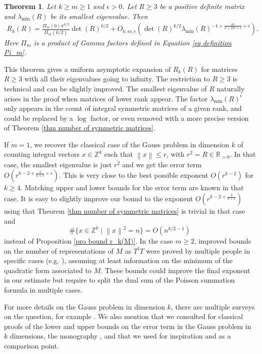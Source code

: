 \documentclass[oneside]{amsart}
\numberwithin{equation}{section}
\newtheorem{theorem}{Theorem}[section]
\theoremstyle{definition}
\theoremstyle{remark}
\theoremstyle{remark}
\newcommand{\RR}{\mathbb R}
\newcommand{\ZZ}{\mathbb Z}
\newcommand{\norm}[1]{\left\lVert #1\right\rVert}		%
\begin{document}
\begin{theorem}\label{thm R_k(R) asymptotic}
Let $k\geq m\geq1$ and $\epsilon>0$. Let $R\geq3$ be a positive definite matrix and $\lambda_{\min}(R)$ be its smallest eigenvalue. Then
\begin{align}\label{eq R_k(R) asymptotic}
R_k(R)=\frac{\Pi_m(0)\pi^{k/2}}{\Pi_m(k/2)}\det(R)^{k/2}+O_{k,m,\epsilon}\left(\det(R)^{k/2}\lambda_{\min}(R)^{-1+\frac m{k+2m+1}+\epsilon}\right).
\end{align}
Here $\Pi_m$ is a product of Gamma factors defined in Equation \eqref{eq definition Pi_m}.
\end{theorem}

This theorem gives a uniform asymptotic expansion of $R_k(R)$ for matrices $R\geq3$ with all their eigenvalues going to infinity. The restriction to $R\geq3$ is technical and can be slightly improved. The smallest eigenvalue of $R$ naturally arises in the proof when matrices of lower rank appear. The factor $\lambda_{\min}(R)^\epsilon$ only appears in the count of integral symmetric matrices of a given rank, and could be replaced by a $\log$ factor, or even removed with a more precise version of Theorem \ref{thm number of symmetric matrices}.

If $m=1$, we recover the classical case of the Gauss problem in dimension $k$ of counting integral vectors $x\in\ZZ^k$ such that $\norm x\leq r$, with $r^2=R\in\RR_{>0}$. In that case, the smallest eigenvalue is just $r^2$ and we get the error term $O(r^{k-2+\frac2{k+3}+\epsilon})$. This is very close to the best possible exponent $O(r^{k-2})$ for $k\geq4$. Matching upper and lower bounds for the error term are known in that case. It is easy to slightly improve our bound to the exponent $O(r^{k-2+\frac2{k+1}})$ using that Theorem \ref{thm number of symmetric matrices} is trivial in that case and
$$\#\{x\in\ZZ^k\mid\norm x^2=n\}=O(n^{k/2-1})$$
instead of Proposition \ref{pro bound r_k(M)}. In the case $m\geq2$, improved bounds on the number of representations of $M$ as $T^tT$ were proved by multiple people in specific cases (e.g. \cite{Rag59,Kit82a,DH13}), assuming at least information on the minimum of the quadratic form associated to $M$. These bounds could improve the final exponent in our estimate but require to split the dual sum of the Poisson summation formula in multiple cases.

For more details on the Gauss problem in dimension $k$, there are multiple surveys on the question, for example \cite{Sch04,IKKN06} . We also mention \cite{Krae00} that we consulted for classical proofs of the lower and upper bounds on the error term in the Gauss problem in $k$ dimensions, the monography \cite{Wal57}, and \cite{EL25} that we used for inspiration and as a comparison point.
\end{document}
